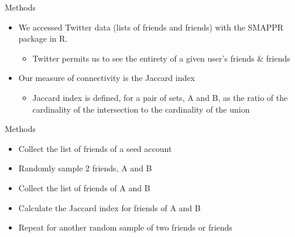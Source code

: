 \documentclass{beamer}
\begin{document}
\begin{frame}{Methods}
\begin{itemize}

\item We accessed Twitter data (lists of friends and friends) with the SMAPPR package in R.
    \begin{itemize}
    \item Twitter permits us to see the entirety of a given user’s friends \& friends
    \end{itemize}
\item Our measure of connectivity is the Jaccard index
    \begin{itemize}
    \item Jaccard index is defined, for a pair of sets, A and B, as the ratio of the cardinality of the intersection to the cardinality of the union
    \end{itemize}
\end{itemize}

\end{frame}

\begin{frame}{Methods}
\begin{itemize}

  \item Collect the list of friends of a seed account
  \item \pause Randomly sample 2 friends, A and B
  \item \pause Collect the list of friends of A and B
  \item \pause Calculate the Jaccard index for friends of A and B  
  \item \pause  Repeat for another random sample of two friends or friends
\end{itemize}

\end{frame}
\end{document}
